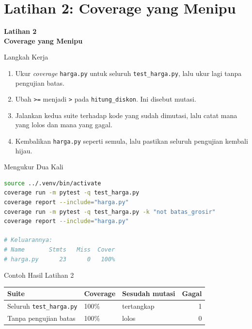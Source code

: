 \documentclass[aspectratio=169, table, 12pt]{beamer}
\begin{document}
\section{Latihan 2: Coverage yang Menipu}

\begin{frame}{\hfill}
  \centering
  \Huge{\textbf{Latihan 2\\Coverage yang Menipu}}
\end{frame}

\begin{frame}{{\Large Langkah Kerja}}
  \vspace{6pt}
  \begin{enumerate}
    \item Ukur \textit{coverage} \texttt{harga.py} untuk seluruh
          \texttt{test\_harga.py}, lalu ukur lagi tanpa pengujian batas.
    \item Ubah \texttt{>=} menjadi \texttt{>} pada \texttt{hitung\_diskon}.
          Ini disebut mutasi.
    \item Jalankan kedua suite terhadap kode yang sudah dimutasi, lalu catat
          mana yang lolos dan mana yang gagal.
    \item Kembalikan \texttt{harga.py} seperti semula, lalu pastikan seluruh
          pengujian kembali hijau.
  \end{enumerate}
\end{frame}

\begin{frame}[fragile]{{\Large Mengukur Dua Kali}}
  \vspace{2pt}
\begin{lstlisting}[language=bash]
source ../.venv/bin/activate
coverage run -m pytest -q test_harga.py
coverage report --include="harga.py"
coverage run -m pytest -q test_harga.py -k "not batas_grosir"
coverage report --include="harga.py"

# Keluarannya:
# Name       Stmts   Miss  Cover
# harga.py      23      0   100%
\end{lstlisting}
\end{frame}

\begin{frame}{{\Large Contoh Hasil Latihan 2}}
  \vspace{6pt}
  \centering
  {\footnotesize
  \begin{tabularx}{\textwidth}{Yllr}
    \hline
    \textbf{Suite} & \textbf{Coverage} & \textbf{Sesudah mutasi} & \textbf{Gagal} \\
    \hline
    Seluruh \texttt{test\_harga.py} & 100\% & tertangkap & 1 \\
    \hline
    Tanpa pengujian batas & 100\% & lolos & 0 \\
    \hline
  \end{tabularx}}
\end{frame}
\end{document}
